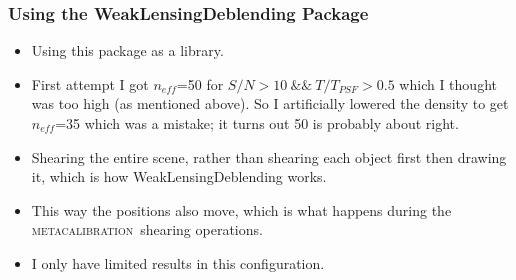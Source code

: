 \documentclass{beamer}
\newcommand{\mcal}{\textsc{metacalibration}}
\newcommand{\snr}{$S/N$}
\newcommand{\neff}{$n_{eff}$}
\begin{document}
\frame
{
    \frametitle{Using the WeakLensingDeblending Package}

 
    \begin{itemize}

        \item Using this package as a library.
            
        \item First attempt I got {\color{brightred} \neff=50} for
            {\color{gold} \snr$ > 10 ~ \&\& ~ T/T_{PSF} > 0.5$} which I thought
            was too high (as mentioned above).  So I artificially lowered
            the density to get \neff=35 which was a mistake; it turns
            out 50 is probably about right.


        \item Shearing the entire scene, rather than shearing each object
            first then drawing it, which is how WeakLensingDeblending
            works.
            
        \item This way the positions also move, which is what happens
            during the \mcal\ shearing operations.

        \item I only have limited results in this configuration.

    \end{itemize}

}
\end{document}
